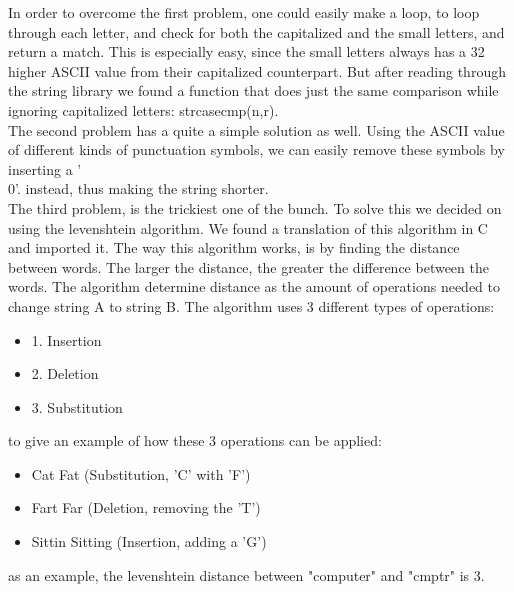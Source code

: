 In order to overcome the first problem, one could easily make a loop, to loop through each letter, and check for both the capitalized and the small letters,
and return a match. This is especially easy, since the small letters always has a 32 higher ASCII value from their capitalized counterpart.
But after reading through the string library we found a function that does just the same comparison while ignoring capitalized letters: strcasecmp(n,r).
\\
The second problem has a quite a simple solution as well. Using the ASCII value of different kinds of punctuation symbols, we can easily remove these symbols by inserting a '\\0'. 
instead, thus making the string shorter.
\\
The third problem, is the trickiest one of the bunch. To solve this we decided on using the levenshtein algorithm. 
We found a translation of this algorithm in C and imported it\cite{levenshtein}.
The way this algorithm works, is by finding the distance between words. The larger the distance, the greater the difference between the words.
The algorithm determine distance as the amount of operations needed to change string A to string B. The algorithm uses 3 different types of operations:
\begin{itemize}
  \item 1. Insertion
  \item 2. Deletion
  \item 3. Substitution
\end{itemize}

to give an example of how these 3 operations can be applied:
\begin{itemize}
  \item Cat  Fat  (Substitution, 'C' with 'F')
  \item Fart  Far  (Deletion, removing the 'T')
  \item Sittin  Sitting  (Insertion, adding a 'G')
\end{itemize}

as an example, the levenshtein distance between "computer" and "cmptr" is 3.

